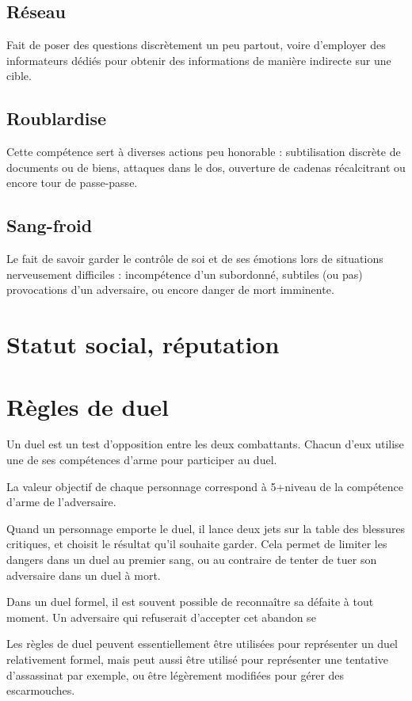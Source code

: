 \documentclass[10pt,a4paper]{book}
\begin{document}
\begin{multicols}{2}
\subsection*{Réseau} Fait de poser des questions discrètement un peu partout, voire d'employer des informateurs dédiés pour obtenir des informations de manière indirecte sur une cible. 
\subsection*{Roublardise} Cette compétence sert à diverses actions peu honorable : subtilisation discrète de documents ou de biens, attaques dans le dos, ouverture de cadenas récalcitrant ou encore tour de passe-passe.
\subsection*{Sang-froid} Le fait de savoir garder le contrôle de soi et de ses émotions lors de situations nerveusement difficiles : incompétence d'un subordonné, subtiles (ou pas) provocations d'un adversaire, ou encore danger de mort imminente.
\section{Statut social, réputation}
\section{Règles de duel}
Un duel est un test d'opposition entre les deux combattants. Chacun d'eux utilise une de ses compétences d'arme pour participer au duel. 

La valeur objectif de chaque personnage correspond à 5+niveau de la compétence d'arme de l'adversaire.

Quand un personnage emporte le duel, il lance deux jets sur la table des blessures critiques, et choisit le résultat qu'il souhaite garder. Cela permet de limiter les dangers dans un duel au premier sang, ou au contraire de tenter de tuer son adversaire dans un duel à mort.

Dans un duel formel, il est souvent possible de reconnaître sa défaite à tout moment. Un adversaire  qui refuserait d'accepter cet abandon se 

Les règles de duel peuvent essentiellement être utilisées pour représenter un duel relativement formel, mais peut aussi être utilisé pour représenter une tentative d'assassinat par exemple, ou être légèrement modifiées pour gérer des escarmouches.
\end{multicols}
\end{document}
